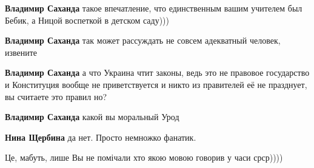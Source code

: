 \begin{itemize}
\begin{itemize}
\textbf{Владимир Саханда} такое впечатление, что единственным вашим учителем был Бебик, а Ницой воспеткой в детском саду)))

 
\textbf{Владимир Саханда} так может рассуждать не совсем адекватный человек, извените

 
\textbf{Владимир Саханда} а что Украина чтит законы, ведь это не правовое государство и Конституция вообще не приветствуется и никто из правителей её не празднует, вы считаете это правил но?

 
\textbf{Владимир Саханда} какой вы моральный Урод

 
\textbf{Нина Щербина} да нет. Просто немножко фанатик.

\end{itemize}

 
Це, мабуть, лише Вы не помічали хто якою мовою говорив у часи срср))))

\begin{itemize}
 

\end{itemize}
\end{itemize}
